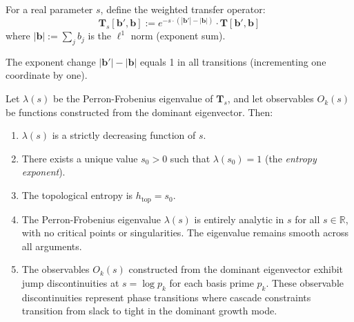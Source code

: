 \begin{definition}
For a real parameter $s$, define the weighted transfer operator:
\begin{equation}
\mathbf{T}_s[\mathbf{b}', \mathbf{b}] := e^{-s \cdot (|\mathbf{b}'| - |\mathbf{b}|)} \cdot \mathbf{T}[\mathbf{b}', \mathbf{b}]
\end{equation}
where $|\mathbf{b}| := \sum_j b_j$ is the $\ell^1$ norm (exponent sum).

The exponent change $|\mathbf{b}'| - |\mathbf{b}|$ equals 1 in all transitions (incrementing one coordinate by one).
\end{definition}

\begin{theorem}
\label{thm:spectral-radius-function}
Let $\lambda(s)$ be the Perron-Frobenius eigenvalue of $\mathbf{T}_s$, and let observables $O_k(s)$ be functions constructed from the dominant eigenvector. Then:

\begin{enumerate}
\item $\lambda(s)$ is a strictly decreasing function of $s$.
\item There exists a unique value $s_0 > 0$ such that $\lambda(s_0) = 1$ (the \emph{entropy exponent}).
\item The topological entropy is $h_{\text{top}} = s_0$.
\item The Perron-Frobenius eigenvalue $\lambda(s)$ is entirely analytic in $s$ for all $s \in \mathbb{R}$, with no critical points or singularities. The eigenvalue remains smooth across all arguments.
\item The observables $O_k(s)$ constructed from the dominant eigenvector exhibit jump discontinuities at $s = \log p_k$ for each basis prime $p_k$. These observable discontinuities represent phase transitions where cascade constraints transition from slack to tight in the dominant growth mode.
\end{enumerate}
\end{theorem}

